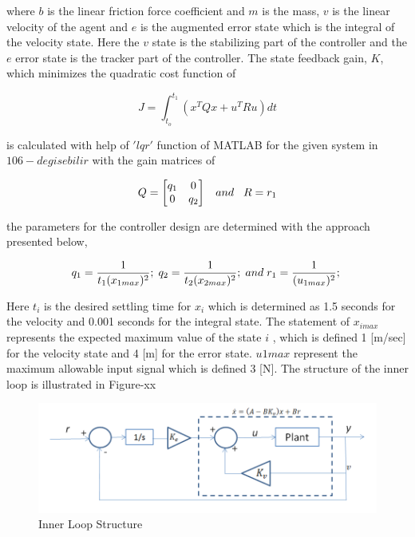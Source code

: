 where $b$ is the linear friction force coefficient and $m$ is the mass, $v$  is the linear velocity of the agent and $e$ is the augmented error state which is the integral of the velocity state. Here the $v$ state is the stabilizing part of the controller and the $e$ error state is the tracker part of the controller. The state feedback gain, $K$, which minimizes the quadratic cost function of

\begin{equation}
J = \int_{t_o}^{t_1}(x^TQx + u^TRu) dt
\end{equation}

is calculated with help of $'lqr'$ function of MATLAB for the given system in $106 - degisebilir$ with the gain matrices of 

\begin{equation}
Q = \begin{bmatrix}
q_1 & 0 \\ 0 & q_2
\end{bmatrix}
\hspace{0.3cm} and
\hspace{0.3cm}
R = r_1
\end{equation}

the parameters for the controller design are determined with the approach presented below,

\begin{equation}
q_1 = \frac{1}{t_1 (x_{1max})^2}; \hspace{0.1cm}
q_2 = \frac{1}{t_2 (x_{2max})^2}; \hspace{0.1cm} and \hspace{0.1cm}
r_1 = \frac{1}{ (u_{1max})^2}; \hspace{0.1cm}
\end{equation}

Here $t_i$  is the desired settling time for $x_i$ which is determined as 1.5 seconds for the velocity and 0.001 seconds for the integral state. The statement of $x_{imax}$ represents the expected maximum value of the state $i$ , which is defined 1 [m/sec] for the velocity state and 4 [m] for the error state. $u{1max}$ represent the maximum allowable input signal which is defined 3 [N]. The structure of the inner loop is illustrated in Figure-xx

\begin{figure}[H]
\caption{Inner Loop Structure}
\centering
\includegraphics[scale = 0.50]{inner_loop}
\end{figure}

